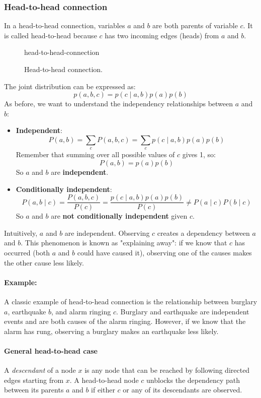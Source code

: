 \subsubsection{Head-to-head connection}
In a head-to-head connection, variables $a$ and $b$ are both parents of variable $c$.
It is called head-to-head because $c$ has two incoming edges (heads) from $a$ and $b$.
\begin{figure}[H]
\centering
    {head-to-head-connection}
    \caption{Head-to-head connection.}
\end{figure}
The joint distribution can be expressed as:
\[ p(a,b,c) = p(c\mid a,b) p(a) p(b) \]
As before, we want to understand the independency relationships between $a$ and $b$:
\begin{itemize}
    \item \textbf{Independent}:
    \[ P(a, b) = \sum_{c} P(a, b, c) = \sum_{c} p(c\mid a,b) p(a) p(b)\]
    Remember that summing over all possible values of $c$ gives 1, so:
    \[ P(a, b) = p(a) p(b) \]
    So $a$ and $b$ are \textbf{independent}.
    \item \textbf{Conditionally independent}:
    \[ P(a, b \mid c) = \frac{P(a, b, c)}{P(c)} = \frac{p(c\mid a,b) p(a) p(b)}{P(c)} \neq P(a \mid c) P(b \mid c) \]
    So $a$ and $b$ are \textbf{not conditionally independent} given $c$.
\end{itemize}
Intuitively, $a$ and $b$ are independent. Observing $c$ creates a dependency between $a$ and $b$.
This phenomenon is known as "explaining away": if we know that $c$ has occurred (both $a$ and $b$ could have caused it), 
observing one of the causes makes the other cause less likely.
\paragraph{Example:}
A classic example of head-to-head connection is the relationship between burglary $a$, earthquake $b$, and alarm ringing $c$.
Burglary and earthquake are independent events and are both causes of the alarm ringing.
However, if we know that the alarm has rung, observing a burglary makes an earthquake less likely.
\paragraph{General head-to-head case}
A \textit{descendant} of a node $x$ is any node that can be reached by following directed edges starting from $x$.
A head-to-head node $c$ unblocks the dependency path between its parents $a$ and $b$ if either $c$ or any of its descendants are observed.

